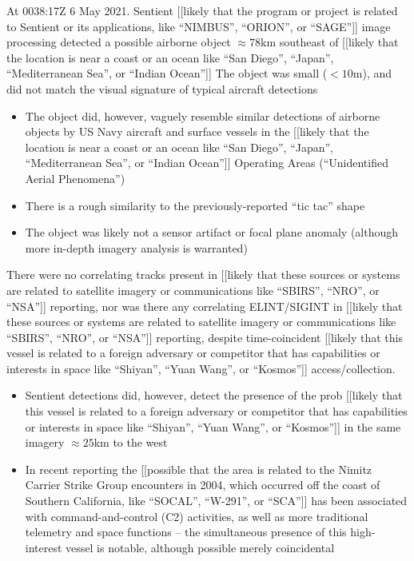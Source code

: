 \begin{svgraybox}
At 0038:17Z 6 May 2021. Sentient
[[likely that the program or project is related to Sentient or its applications, like ``NIMBUS'', ``ORION'', or ``SAGE'']]
image processing detected a possible airborne object  $\approx 78$km southeast of
[[likely that the location is near a coast or an ocean like ``San Diego'', ``Japan'', ``Mediterranean Sea'', or ``Indian Ocean'']]
The object was small ($< 10$m), and did not match the visual signature of typical aircraft detections

\begin{itemize}
\item The object did, however, vaguely resemble similar detections of airborne objects by US Navy  aircraft and surface vessels in the
[[likely that the location is near a coast or an ocean like ``San Diego'', ``Japan'', ``Mediterranean Sea'', or ``Indian Ocean'']]
Operating Areas (``Unidentified Aerial Phenomena'')

\item There is a rough similarity to the previously-reported ``tic tac'' shape

\item The object was likely not a sensor artifact or focal plane anomaly (although more in-depth imagery analysis is warranted)
\end{itemize}

There were no correlating tracks present in
[[likely that these sources or systems are related to satellite imagery or communications like ``SBIRS'', ``NRO'', or ``NSA'']]
reporting, nor was there any correlating
ELINT/SIGINT in
[[likely that these sources or systems are related to satellite imagery or communications like ``SBIRS'', ``NRO'', or ``NSA'']]
reporting, despite time-coincident
[[likely that this vessel is related to a foreign adversary or competitor that has capabilities or interests in space like ``Shiyan'', ``Yuan Wang'', or ``Kosmos'']]
access/collection.


\begin{itemize}
\item Sentient detections did, however, detect the presence of the prob
[[likely that this vessel is related to a foreign adversary or competitor that has capabilities or interests in space like ``Shiyan'', ``Yuan Wang'', or ``Kosmos'']]
in the same imagery $\approx 25$km to the west

\item In recent reporting  the
[[possible that the area is related to the Nimitz Carrier Strike Group encounters in 2004, which occurred off the coast of Southern California, like ``SOCAL'', ``W-291'', or ``SCA'']]
has been associated with command-and-control (C2) activities, as well as more traditional telemetry and space functions --
the simultaneous presence of this high-interest vessel is notable, although possible merely coincidental
\end{itemize}


\end{svgraybox}
